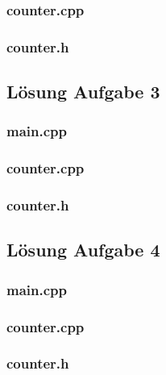 \subsubsection{counter.cpp}

\subsubsection{counter.h}


\subsection{Lösung Aufgabe 3}
\subsubsection{main.cpp}

\subsubsection{counter.cpp}

\subsubsection{counter.h}


\subsection{Lösung Aufgabe 4}
\subsubsection{main.cpp}

\subsubsection{counter.cpp}

\subsubsection{counter.h}


